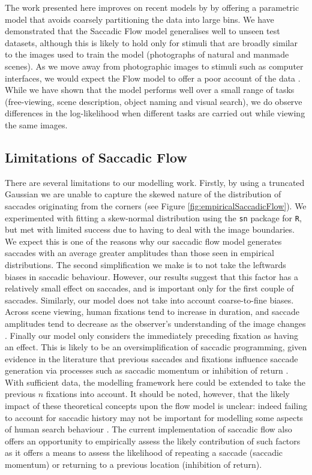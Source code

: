 \documentclass[a4paper, twocolumn, oneside, 11pt]{article}
\begin{document}
The work presented here improves on recent models by \cite{clarke2016,leMeur-coutrot2016} by offering a parametric model that avoids coarsely partitioning the data into large bins. We have demonstrated that the Saccadic Flow model generalises well to unseen test datasets, although this is likely to hold only for stimuli that are broadly similar to the images used to train the model (photographs of natural and manmade scenes). As we move away from photographic images to stimuli such as computer interfaces, we would expect the Flow model to offer a poor account of the data \citep{leMeur-coutrot2016}. While we have shown that the model performs well over a small range of tasks (free-viewing, scene description, object naming and visual search), we do observe differences in the log-likelihood when different tasks are carried out while viewing the same images. 

\subsection{Limitations of Saccadic Flow}

There are several limitations to our modelling work. Firstly, by using a truncated Gaussian we are unable to capture the skewed nature of the distribution of saccades originating from the corners (see Figure  \ref{fig:empiricalSaccadicFlow}). We experimented with fitting a skew-normal distribution using the \texttt{sn} package for \texttt{R}, but met with limited success due to having to deal with the image boundaries. We expect this is one of the reasons why our saccadic flow model generates saccades with an average greater amplitudes than those seen in empirical distributions.  The second simplification we make is to not take the leftwards biases in saccadic behaviour. However, our results suggest that this factor has a relatively small effect on saccades, and is important only for the first couple of saccades. Similarly, our model does not take into account coarse-to-fine biases. Across scene viewing, human fixations tend to increase in duration, and saccade amplitudes tend to decrease as the observer's understanding of the image changes \citep{antes1974}. Finally our model only considers the immediately preceding fixation as having an effect. This is likely to be an oversimplification of saccadic programming, given evidence in the literature that previous saccades and fixations influence saccade generation via processes such as saccadic momentum or inhibition of return \citep{macinnes2014}. With sufficient data, the modelling framework here could be extended to take the previous $n$ fixations into account. It should be noted, however, that the likely impact of these theoretical concepts upon the flow model is unclear: indeed failing to account for saccadic history may not be important for modelling some aspects of human search behaviour \citep{clarke2016}. The current implementation of saccadic flow also offers an opportunity to empirically assess the likely contribution of such factors as it offers a means to assess the likelihood of repeating a saccade (saccadic momentum) or returning to a previous location (inhibition of return).
\end{document}
